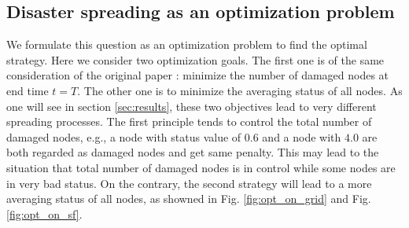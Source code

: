 \subsection{Disaster spreading as an optimization problem}
We formulate this question as an optimization problem to find the optimal strategy. Here we consider two optimization goals. The first one is of the same consideration of the original paper \cite{buzna2007efficient}: minimize the number of damaged nodes at end time $t = T$. The other one is to minimize the averaging status of all nodes. As one will see in section \ref{sec:results}, these two objectives lead to very different spreading processes. The first principle tends to control the total number of damaged nodes, e.g., a node with status value of $0.6$ and a node with $4.0$ are both regarded as damaged nodes and get same penalty. This may lead to the situation that total number of damaged nodes is in control while some nodes are in very bad status. On the contrary, the second strategy will lead to a more averaging status of all nodes, as showned in Fig. \ref{fig:opt_on_grid} and Fig.\ref{fig:opt_on_sf}.